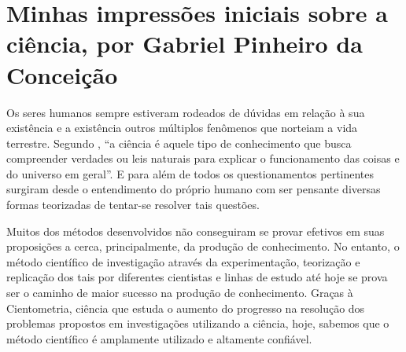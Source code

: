 \section{Minhas impressões iniciais sobre a ciência, por Gabriel Pinheiro da Conceição}

Os seres humanos sempre estiveram rodeados de dúvidas em relação à sua existência e a existência outros múltiplos fenômenos que norteiam a vida terrestre. Segundo \citet{gnipper_o_nodate}, ``a ciência é aquele tipo de conhecimento que busca compreender verdades ou leis naturais para explicar o funcionamento das coisas e do universo em geral''. E para além de todos os questionamentos pertinentes surgiram desde o entendimento do próprio humano com ser pensante diversas formas teorizadas de tentar-se resolver tais questões.

Muitos dos métodos desenvolvidos não conseguiram se provar efetivos em suas proposições a cerca, principalmente, da produção de conhecimento. No entanto, o método científico de investigação através da experimentação, teorização e replicação dos tais por diferentes cientistas e linhas de estudo até hoje se prova ser o caminho de maior sucesso na produção de conhecimento. Graças à \gls{Cientometria}, ciência que estuda o aumento do progresso na resolução dos problemas propostos em investigações utilizando a ciência, hoje, sabemos que o método científico é amplamente utilizado e altamente confiável.